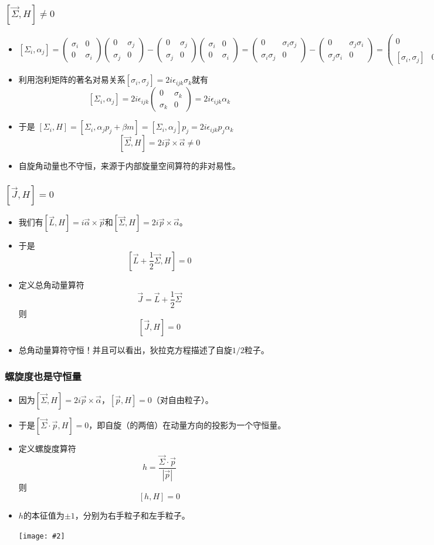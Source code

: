 \documentclass[aspectratio=1610,14pt,matheuler]{beamer}
\newcommand{\bch}{}
\newcommand{\ech}{}
\newcommand{\mat}[1]{\begin{pmatrix}#1\end{pmatrix}}
\newcommand{\cpic}[2]{
\begin{center}
\texttt{[image: \#2]}
\end{center}
}
\begin{document}
\begin{frame}
\frametitle{\bch $[\vec \varSigma, H ] \not= 0$ \ech}
\bch
\begin{itemize}
\item
$[\varSigma_i,\alpha_j] = \mat{\sigma_i & 0 \\ 0  & \sigma_i} \mat{0 & \sigma_j \\ \sigma_j &0}- \mat{0 & \sigma_j \\ \sigma_j &0} \mat{\sigma_i & 0 \\ 0 & \sigma_i} = \mat{0 & \sigma_i \sigma_j \\ \sigma_i \sigma_j &0}-\mat{0 & \sigma_j \sigma_i \\ \sigma_j \sigma_i & 0} = \mat{0 & [\sigma_i,\sigma_j] \\ [\sigma_i,\sigma_j] & 0}$
\item 利用泡利矩阵的著名对易关系$[\sigma_i,\sigma_j] = 2i \epsilon_{ijk} \sigma_k$就有
$$[\varSigma_i,\alpha_j] = 2i\epsilon_{ijk} \mat{0 &\sigma_k \\ \sigma_k &0 } = 2i\epsilon_{ijk} \alpha_k$$
\item
于是
$
[\varSigma_i ,H] = [\varSigma_i,\alpha_j p_j + \beta m]=  [\varSigma_i,\alpha_j]p_j = 2i\epsilon_{ijk} p_j \alpha_k
$
$$
[\vec \varSigma, H] = 2i \vec p \times \vec \alpha \not= 0
$$
\item 自旋角动量也不守恒，来源于内部旋量空间算符的非对易性。
\end{itemize}
\ech
\end{frame}

\begin{frame}
\frametitle{\bch $[\vec J, H ] = 0$ \ech}
\bch
\begin{itemize}
\item
我们有$[\vec L , H] = i \vec \alpha \times \vec p$和$[\vec \varSigma, H] = 2i\vec p \times \vec \alpha$。
\item
于是$$[\vec L + \frac{1}{2} \vec \varSigma,H] = 0$$
\item
定义总角动量算符
{\color{blue}
$$ \vec J = \vec L + \frac{1}{2} \vec \varSigma$$}
则$$[\vec J,H]=0$$
\item 总角动量算符守恒！并且可以看出，狄拉克方程描述了自旋$1/2$粒子。
\end{itemize}
\ech
\end{frame}

\begin{frame}
\frametitle{\bch 螺旋度也是守恒量 \ech}
\bch
\begin{itemize}
\item
因为$[\vec \varSigma, H] = 2i\vec p \times \vec \alpha$，$[\vec p,H]=0$（对自由粒子）。
\item
于是$[\vec \varSigma\cdot \vec p,H] = 0$，即自旋（的两倍）在动量方向的投影为一个守恒量。
\item
定义螺旋度算符
{\color{blue}
$$ h = \frac{\vec \varSigma \cdot \vec p}{|\vec p|}$$}
则$$[h,H]=0$$
\item $h$的本征值为$\pm 1$，分别为右手粒子和左手粒子。
\cpic{0.2}{helicity}
\end{itemize}
\ech
\end{frame}
\end{document}
